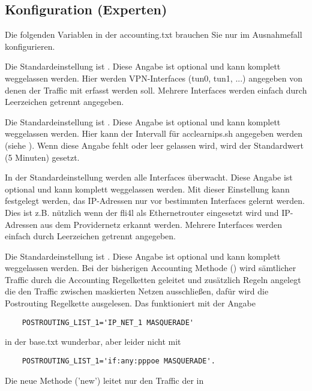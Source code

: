 \subsection{Konfiguration (Experten)}
Die folgenden Variablen in der accounting.txt brauchen Sie nur im Ausnahmefall
konfigurieren.

\begin{description}

Die Standardeinstellung ist .
Diese Angabe ist optional und kann komplett weggelassen werden.
Hier werden VPN-Interfaces (tun0, tun1, ...) angegeben von denen der Traffic mit erfasst werden soll.
Mehrere Interfaces werden einfach durch Leerzeichen getrennt angegeben.

Die Standardeinstellung ist .
Diese Angabe ist optional und kann komplett weggelassen werden.
Hier kann der Intervall für acclearnips.sh angegeben werden (siehe
).
Wenn diese Angabe fehlt oder leer gelassen wird,
wird der Standardwert (5 Minuten) gesetzt.

In der Standardeinstellung werden alle Interfaces überwacht.
Diese Angabe ist optional und kann komplett weggelassen werden.
Mit dieser Einstellung kann festgelegt werden, das IP-Adressen nur vor bestimmten
Interfaces gelernt werden. Dies ist z.B. nützlich wenn der fli4l als Ethernetrouter
eingesetzt wird und IP-Adressen aus dem Providernetz erkannt werden.
Mehrere Interfaces werden einfach durch Leerzeichen getrennt angegeben.

Die Standardeinstellung ist .
Diese Angabe ist optional und kann komplett weggelassen werden.
Bei der bisherigen Accounting Methode () wird sämtlicher Traffic durch die
Accounting Regelketten geleitet und zusätzlich Regeln angelegt die den Traffic
zwischen maskierten Netzen ausschließen, dafür wird die Postrouting Regelkette
ausgelesen. Das funktioniert mit der Angabe
\begin{example}
\begin{verbatim}
    POSTROUTING_LIST_1='IP_NET_1 MASQUERADE'
\end{verbatim}
\end{example}
in der base.txt wunderbar, aber leider nicht mit
\begin{example}
\begin{verbatim}
    POSTROUTING_LIST_1='if:any:pppoe MASQUERADE'.
\end{verbatim}
\end{example}
Die neue Methode ('new') leitet nur den Traffic der in


\end{description}
